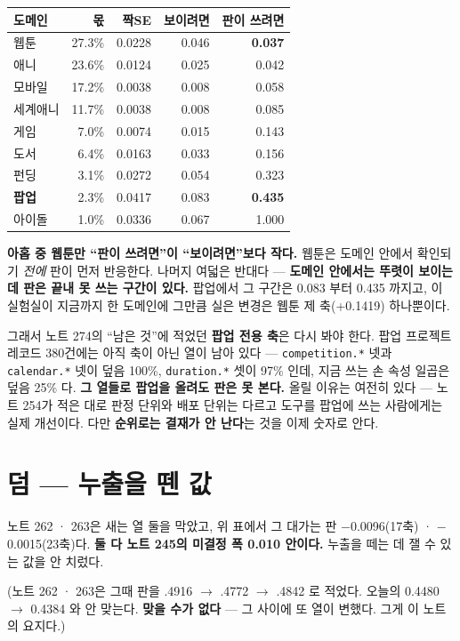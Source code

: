 \documentclass[10pt]{article}
\begin{document}
\begin{center}\small
\begin{tabular}{lrrrr}
\hline
도메인 & 몫 & 짝SE & 보이려면 & 판이 쓰려면 \\
\hline
웹툰 & 27.3\% & 0.0228 & 0.046 & \textbf{0.037} \\
애니 & 23.6\% & 0.0124 & 0.025 & 0.042 \\
모바일 & 17.2\% & 0.0038 & 0.008 & 0.058 \\
세계애니 & 11.7\% & 0.0038 & 0.008 & 0.085 \\
게임 & 7.0\% & 0.0074 & 0.015 & 0.143 \\
도서 & 6.4\% & 0.0163 & 0.033 & 0.156 \\
펀딩 & 3.1\% & 0.0272 & 0.054 & 0.323 \\
\textbf{팝업} & 2.3\% & 0.0417 & 0.083 & \textbf{0.435} \\
아이돌 & 1.0\% & 0.0336 & 0.067 & 1.000 \\
\hline
\end{tabular}
\end{center}

\textbf{아홉 중 웹툰만 ``판이 쓰려면''이 ``보이려면''보다 작다.} 웹툰은
도메인 안에서 확인되기 \emph{전에} 판이 먼저 반응한다. 나머지 여덟은
반대다 --- \textbf{도메인 안에서는 뚜렷이 보이는데 판은 끝내 못 쓰는 구간이
있다.} 팝업에서 그 구간은 0.083 부터 0.435 까지고, 이 실험실이 지금까지
한 도메인에 그만큼 실은 변경은 웹툰 제 축(+0.1419) 하나뿐이다.

그래서 노트 274의 ``남은 것''에 적었던 \textbf{팝업 전용 축}은 다시 봐야
한다. 팝업 프로젝트 레코드 380건에는 아직 축이 아닌 열이 남아 있다 ---
\texttt{competition.*} 넷과 \texttt{calendar.*} 넷이 덮음 100\%,
\texttt{duration.*} 셋이 97\% 인데, 지금 쓰는 손 속성 일곱은 덮음 25\% 다.
\textbf{그 열들로 팝업을 올려도 판은 못 본다.} 올릴 이유는 여전히 있다 ---
노트 254가 적은 대로 판정 단위와 배포 단위는 다르고 도구를 팝업에 쓰는
사람에게는 실제 개선이다. 다만 \textbf{순위로는 결재가 안 난다}는 것을
이제 숫자로 안다.

\section{덤 --- 누출을 뗀 값}

노트 262 · 263은 새는 열 둘을 막았고, 위 표에서 그 대가는 판
$-$0.0096(17축) · $-$0.0015(23축)다. \textbf{둘 다 노트 245의 미결정 폭
0.010 안이다.} 누출을 떼는 데 잴 수 있는 값을 안 치렀다.

(노트 262 · 263은 그때 판을 .4916 $\to$ .4772 $\to$ .4842 로 적었다. 오늘의
0.4480 $\to$ 0.4384 와 안 맞는다. \textbf{맞을 수가 없다} --- 그 사이에
또 열이 변했다. 그게 이 노트의 요지다.)
\end{document}
